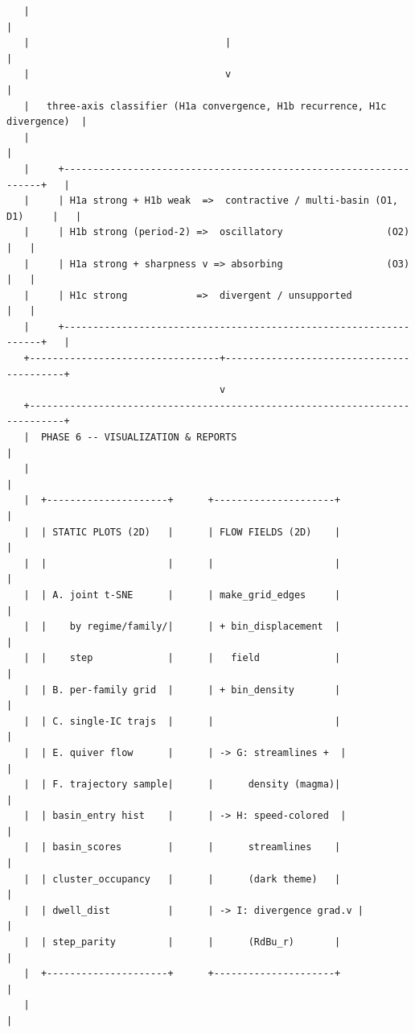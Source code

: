 \documentclass{article}
\theoremstyle{plain}
\theoremstyle{definition}
\begin{document}
\begin{verbatim}
   |                                                                            |
   |                                  |                                         |
   |                                  v                                         |
   |   three-axis classifier (H1a convergence, H1b recurrence, H1c divergence)  |
   |                                                                            |
   |     +------------------------------------------------------------------+   |
   |     | H1a strong + H1b weak  =>  contractive / multi-basin (O1, D1)     |   |
   |     | H1b strong (period-2) =>  oscillatory                  (O2)       |   |
   |     | H1a strong + sharpness v => absorbing                  (O3)       |   |
   |     | H1c strong            =>  divergent / unsupported                 |   |
   |     +------------------------------------------------------------------+   |
   +---------------------------------+------------------------------------------+
                                     v
   +----------------------------------------------------------------------------+
   |  PHASE 6 -- VISUALIZATION & REPORTS                                         |
   |                                                                            |
   |  +---------------------+      +---------------------+                      |
   |  | STATIC PLOTS (2D)   |      | FLOW FIELDS (2D)    |                      |
   |  |                     |      |                     |                      |
   |  | A. joint t-SNE      |      | make_grid_edges     |                      |
   |  |    by regime/family/|      | + bin_displacement  |                      |
   |  |    step             |      |   field             |                      |
   |  | B. per-family grid  |      | + bin_density       |                      |
   |  | C. single-IC trajs  |      |                     |                      |
   |  | E. quiver flow      |      | -> G: streamlines +  |                      |
   |  | F. trajectory sample|      |      density (magma)|                      |
   |  | basin_entry hist    |      | -> H: speed-colored  |                      |
   |  | basin_scores        |      |      streamlines    |                      |
   |  | cluster_occupancy   |      |      (dark theme)   |                      |
   |  | dwell_dist          |      | -> I: divergence grad.v |                      |
   |  | step_parity         |      |      (RdBu_r)       |                      |
   |  +---------------------+      +---------------------+                      |
   |                                                                            |

\end{verbatim}
\end{document}
